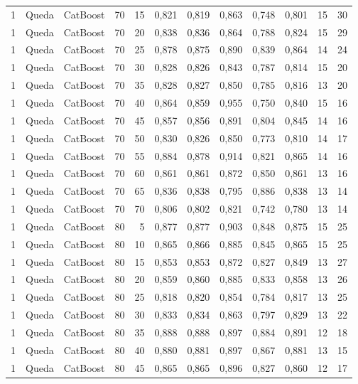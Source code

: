 \begin{longtable}{ccclrrrrrrrr}
1 & Queda & CatBoost & 70 & 15 & 0,821 & 0,819 & 0,863 & 0,748 & 0,801 & 15 & 30 \\
1 & Queda & CatBoost & 70 & 20 & 0,838 & 0,836 & 0,864 & 0,788 & 0,824 & 15 & 29 \\
1 & Queda & CatBoost & 70 & 25 & 0,878 & 0,875 & 0,890 & 0,839 & 0,864 & 14 & 24 \\
1 & Queda & CatBoost & 70 & 30 & 0,828 & 0,826 & 0,843 & 0,787 & 0,814 & 15 & 20 \\
1 & Queda & CatBoost & 70 & 35 & 0,828 & 0,827 & 0,850 & 0,785 & 0,816 & 13 & 20 \\
1 & Queda & CatBoost & 70 & 40 & 0,864 & 0,859 & 0,955 & 0,750 & 0,840 & 15 & 16 \\
1 & Queda & CatBoost & 70 & 45 & 0,857 & 0,856 & 0,891 & 0,804 & 0,845 & 14 & 16 \\
1 & Queda & CatBoost & 70 & 50 & 0,830 & 0,826 & 0,850 & 0,773 & 0,810 & 14 & 17 \\
1 & Queda & CatBoost & 70 & 55 & 0,884 & 0,878 & 0,914 & 0,821 & 0,865 & 14 & 16 \\
1 & Queda & CatBoost & 70 & 60 & 0,861 & 0,861 & 0,872 & 0,850 & 0,861 & 13 & 16 \\
1 & Queda & CatBoost & 70 & 65 & 0,836 & 0,838 & 0,795 & 0,886 & 0,838 & 13 & 14 \\
1 & Queda & CatBoost & 70 & 70 & 0,806 & 0,802 & 0,821 & 0,742 & 0,780 & 13 & 14 \\
1 & Queda & CatBoost & 80 & 5 & 0,877 & 0,877 & 0,903 & 0,848 & 0,875 & 15 & 25 \\
1 & Queda & CatBoost & 80 & 10 & 0,865 & 0,866 & 0,885 & 0,845 & 0,865 & 15 & 25 \\
1 & Queda & CatBoost & 80 & 15 & 0,853 & 0,853 & 0,872 & 0,827 & 0,849 & 13 & 27 \\
1 & Queda & CatBoost & 80 & 20 & 0,859 & 0,860 & 0,885 & 0,833 & 0,858 & 13 & 26 \\
1 & Queda & CatBoost & 80 & 25 & 0,818 & 0,820 & 0,854 & 0,784 & 0,817 & 13 & 25 \\
1 & Queda & CatBoost & 80 & 30 & 0,833 & 0,834 & 0,863 & 0,797 & 0,829 & 13 & 22 \\
1 & Queda & CatBoost & 80 & 35 & 0,888 & 0,888 & 0,897 & 0,884 & 0,891 & 12 & 18 \\
1 & Queda & CatBoost & 80 & 40 & 0,880 & 0,881 & 0,897 & 0,867 & 0,881 & 13 & 15 \\
1 & Queda & CatBoost & 80 & 45 & 0,865 & 0,865 & 0,896 & 0,827 & 0,860 & 12 & 17 \\

\end{longtable}
